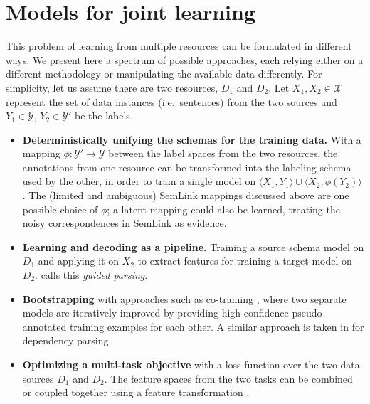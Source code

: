 \documentclass[11pt]{article}
\begin{document}
\section{Models for joint learning}\label{sec:modeling}
This problem of learning from multiple resources can be formulated in different ways. We present here a spectrum of possible approaches, each relying either on a different methodology or manipulating the available data differently. For simplicity, let us assume there are two resources, $D_1$ and $D_2$. Let $X_1, X_2 \in \mathcal{X}$ represent the set of data instances (i.e.~sentences) from the two sources and $Y_1 \in \mathcal{Y}$, $Y_2 \in \mathcal{Y}'$ be the labels.
\begin{itemize}
\item \textbf{Deterministically unifying the schemas for the training data.} With a mapping $\phi : \mathcal{Y}' \rightarrow \mathcal{Y}$ between the label spaces from the two resources, the annotations from one resource can be transformed into the labeling schema used by the other, in order to train a single model 
on $\langle X_1, Y_1\rangle \cup \langle X_2, \phi(Y_2)\rangle$. The (limited and ambiguous) SemLink mappings discussed above are one possible choice of $\phi$; 
a latent mapping could also be learned, treating the noisy correspondences in SemLink as evidence.
\item \textbf{Learning and decoding as a pipeline.} Training a source schema model on $D_1$ and applying it on $X_2$ to extract features for training a target model on $D_2$. 
 calls this \emph{guided parsing}. 
\item \textbf{Bootstrapping} with approaches such as co-training \citep{blum-98,clark03}, where two separate models are iteratively improved by 
providing high-confidence pseudo-annotated training examples for each other. A similar approach is taken in \citet{zhou:2013} for dependency parsing.
\item \textbf{Optimizing a multi-task objective} with a loss function over the two data sources $D_1$ and $D_2$. 
The feature spaces from the two tasks can be combined \citep{daume-07,johansson-13} or coupled together using a feature transformation \citep{mtfl,scl}.
\end{itemize}
\end{document}
